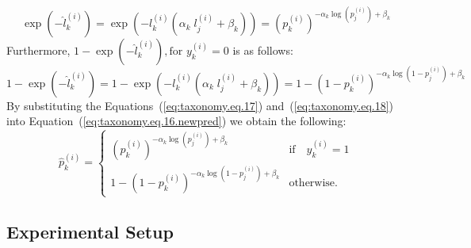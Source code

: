 \begin{equation}
    \label{eq:taxonomy.eq.17}
    \exp{\left(-{\widehat l}_k^{(i)}\right)}=\exp{\left(-l_k^{(i)}\left(\alpha_k\;l_j^{(i)}+\beta_k\right)\right)}={\left(p_k^{(i)}\right)}^{-\alpha_k{\log{\left(p_j^{(i)}\right)}}+\beta_k}
\end{equation}
Furthermore, $1-\exp{\left(-{\widehat l}_k^{(i)}\right)},\text{for } y_k^{(i)}=0 $ is as follows:
\begin{equation}
    \label{eq:taxonomy.eq.18}
    1-\exp{\left(-{\widehat l}_k^{(i)}\right)}=1-\exp{\left(-l_k^{(i)}\left(\alpha_k\;l_j^{(i)}+\beta_k\right)\right)}={1-\left(1-p_k^{(i)}\right)}^{-\alpha_k{\log{\left(1-p_j^{(i)}\right)}}+\beta_k}
\end{equation}
By substituting the Equations~(\ref{eq:taxonomy.eq.17}) and~(\ref{eq:taxonomy.eq.18})  into Equation~(\ref{eq:taxonomy.eq.16.newpred})  we obtain the following:
\begin{equation}
    \label{eq:taxonomy.eq.19.newpred}
    \widehat{p}_k^{(i)} =
    \begin{cases}
        {\left( p_k^{(i)} \right)}^{-\alpha_k \log(p_j^{(i)}) + \beta_k} & \text{if} \quad y_k^{(i)} = 1 \\
        1 - {\left( 1 - p_k^{(i)} \right)}^{-\alpha_k \log{\left( 1 - p_j^{(i)} \right)} + \beta_k} & \text{otherwise.}
    \end{cases}
\end{equation}
\subsection{Experimental Setup}
